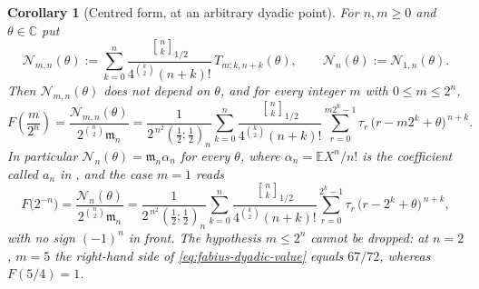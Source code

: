 \documentclass[11pt,oneside,openany]{book}
\newtheorem{corollary}[corollary]{Corollary}
\theoremstyle{definition}
\theoremstyle{remark}
\newcommand{\Qbinom}[3]{\genfrac{[}{]}{0pt}{}{#1}{#2}_{#3}}
\newcommand{\C}{\mathbb C}
\newcommand{\defeq}{\mathrel{:=}}
\begin{document}
\begin{corollary}[Centred form, at an arbitrary dyadic point]\label{cor:fabius-centered-formula}
For $n,m\ge0$ and $\theta\in\C$ put
\begin{equation}\label{eq:dyadic-numerator}
 \mathcal N_{m,n}(\theta)
 \defeq\sum_{k=0}^{n}
 \frac{\Qbinom nk{1/2}}{4^{\binom k2}(n+k)!}\,T_{m;k,n+k}(\theta),
 \qquad
 \mathcal N_n(\theta)\defeq\mathcal N_{1,n}(\theta).
\end{equation}
Then $\mathcal N_{m,n}(\theta)$ does not depend on $\theta$, and for every integer $m$
with $0\le m\le2^n$,
\begin{equation}\label{eq:fabius-dyadic-value}
 F\!\left(\frac m{2^n}\right)
 =\frac{\mathcal N_{m,n}(\theta)}{2^{\binom n2}\mathfrak m_n}
 =\frac1{2^{\,n^2}\left(\frac12;\frac12\right)_n}
 \sum_{k=0}^{n}
 \frac{\Qbinom nk{1/2}}{4^{\binom k2}(n+k)!}
 \sum_{r=0}^{m2^k-1}\tau_r\,\bigl(r-m2^k+\theta\bigr)^{\,n+k}.
\end{equation}
In particular $\mathcal N_n(\theta)=\mathfrak m_n\alpha_n$ for every $\theta$, where
$\alpha_n=\mathbb EX^n/n!$ is the coefficient called $a_n$ in
, and the case $m=1$ reads
\begin{equation}\label{eq:fabius-centered-formula}
 F\bigl(2^{-n}\bigr)
 =\frac{\mathcal N_n(\theta)}{2^{\binom n2}\mathfrak m_n}
 =\frac1{2^{\,n^2}\left(\frac12;\frac12\right)_n}
 \sum_{k=0}^{n}
 \frac{\Qbinom nk{1/2}}{4^{\binom k2}(n+k)!}
 \sum_{r=0}^{2^k-1}\tau_r\,\bigl(r-2^k+\theta\bigr)^{\,n+k},
\end{equation}
with no sign $(-1)^n$ in front.  The hypothesis $m\le2^n$ cannot be dropped: at
$n=2$, $m=5$ the right-hand side of \eqref{eq:fabius-dyadic-value} equals $67/72$,
whereas $F(5/4)=1$.
\end{corollary}
\end{document}
